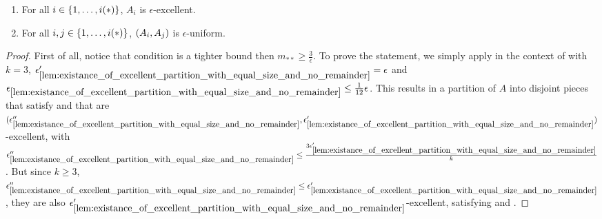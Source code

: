 \begin{lemma}
\begin{enumerate}[label=(\roman*), ref=\roman*]
                \item \label{itm:resume_of_all_conditions_for_excellent_partitions.ii}
                    For all $i \in \{ 1, \dots, i(*) \}$, $A_i$ is $\epsilon$-excellent.
                \item \label{itm:resume_of_all_conditions_for_excellent_partitions.iii}
                    For all $i, j \in \{ 1, \dots, i(*) \}$, $( A_i, A_j )$ is $\epsilon$-uniform.
            \end{enumerate}
            \begin{proof}
                First of all, notice that condition 
                is a tighter bound then $m_{**} \geq \frac{3}{\epsilon}$.
                To prove the statement, we simply apply 
                in the context of  with $k = 3$,
                ${\epsilon'_{\ref{lem:existance_of_excellent_partition_with_equal_size_and_no_remainder}}} = \epsilon$
                and ${\epsilon_{\ref{lem:existance_of_excellent_partition_with_equal_size_and_no_remainder}}} \leq \frac{1}{12} \epsilon$.
                This results in a partition of $A$ into disjoint pieces that satisfy
                 and that are
                $( {\epsilon''_{\ref{lem:existance_of_excellent_partition_with_equal_size_and_no_remainder}}},
                    \epsilon'_{\ref{lem:existance_of_excellent_partition_with_equal_size_and_no_remainder}} )$-excellent,
                with ${\epsilon''_{\ref{lem:existance_of_excellent_partition_with_equal_size_and_no_remainder}}} \leq
                    \frac{3 \epsilon'_{\ref{lem:existance_of_excellent_partition_with_equal_size_and_no_remainder}}}{k}$.
                But since $k \geq 3$, ${\epsilon''_{\ref{lem:existance_of_excellent_partition_with_equal_size_and_no_remainder}}} \leq
                    \epsilon'_{\ref{lem:existance_of_excellent_partition_with_equal_size_and_no_remainder}}$, they are also
                $\epsilon'_{\ref{lem:existance_of_excellent_partition_with_equal_size_and_no_remainder}}$-excellent, satisfying
                 and
                .
            \end{proof}
        \end{lemma}

